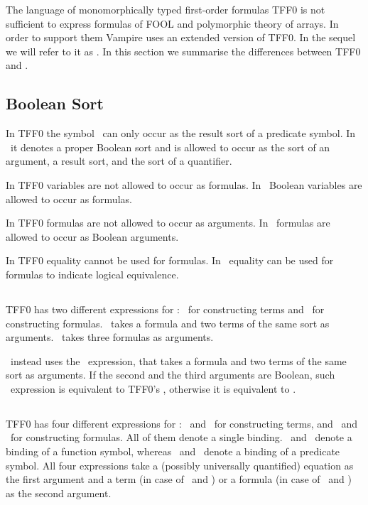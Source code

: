 The language of monomorphically typed first-order formulas TFF0 is not sufficient to express formulas of FOOL and polymorphic theory of arrays. In order to support them Vampire uses an extended version of TFF0. In the sequel we will refer to it as \extTFF. In this section we summarise the differences between TFF0 and \extTFF.

\subsection{Boolean Sort}
In TFF0 the symbol \tptpo\ can only occur as the result sort of a predicate symbol. In \extTFF\ it denotes a proper Boolean sort and is allowed to occur as the sort of an argument, a result sort, and the sort of a quantifier.

In TFF0 variables are not allowed to occur as formulas. In \extTFF\ Boolean variables are allowed to occur as formulas.

In TFF0 formulas are not allowed to occur as arguments. In \extTFF\ formulas are allowed to occur as Boolean arguments.

In TFF0 equality cannot be used for formulas. In \extTFF\ equality can be used for formulas to indicate logical equivalence.

\subsection{\ITE}
TFF0 has two different expressions for \ITE: \ditet\ for constructing terms and \ditef\ for constructing formulas. \ditet\ takes a formula and two terms of the same sort as arguments. \ditef\ takes three formulas as arguments.

\extTFF\ instead uses the \dite\  expression, that takes a formula and two terms of the same sort as arguments. If the second and the third arguments are Boolean, such \dite\ expression is equivalent to TFF0's \ditef, otherwise it is equivalent to \ditet.

\subsection{\LETIN}
TFF0 has four different expressions for \LETIN: \dlettt\ and \dletft\ for constructing terms, and \dlettf\ and \dletff\ for constructing formulas. All of them denote a single binding. \dlettt\ and \dlettf\ denote a binding of a function symbol, whereas \dletft\ and \dletff\ denote a binding of a predicate symbol. All four expressions take a (possibly universally quantified) equation as the first argument and a term (in case of \dlettt\ and \dletft) or a formula (in case of \dlettf\ and \dletff) as the second argument.


